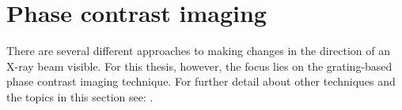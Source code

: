 \section{Phase contrast imaging}\label{sec:phase}
There are several different approaches to making changes in the direction of an X-ray beam visible. For this thesis, however, the focus lies on the grating-based phase contrast imaging technique. 
For further detail about other techniques and the topics in this section see: \citep{Momose2005,Bech2009,Pfeiffer2006,Weitkamp2005,Veen2004,WeitkampPfeiffer2006,Creath1988}.      
